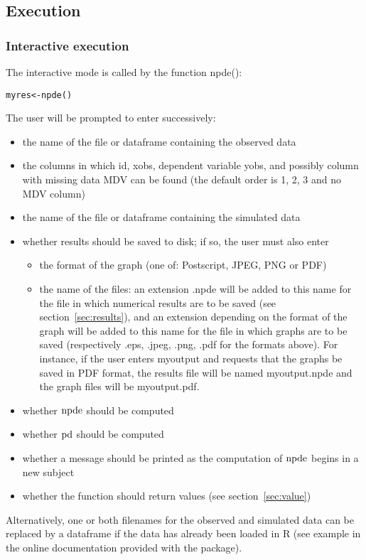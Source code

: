 \subsection{Execution}

\subsubsection{Interactive execution}

\hskip 18pt The interactive mode is called by the function {\sf npde()}:
\begin{verbatim}
myres<-npde()
\end{verbatim}
The user will be prompted to enter successively:
\begin{itemize}
\item the name of the file or dataframe containing the observed data
\item the columns in which id, xobs, dependent variable yobs, and possibly
column with missing data MDV can be found (the default order is 1, 2, 3 and no
MDV column)
\item the name of the file or dataframe containing the simulated data
\item whether results should be saved to disk; if so, the user must also enter
   \begin{itemize}
   \item the format of the graph (one of: Postscript, JPEG, PNG or PDF)
   \item the name of the files: an extension {\sf .npde} will be added to this name for the file in which numerical results are to be saved (see section~\ref{sec:results}), and an extension depending on the format of the graph will be added to this name for the file in which graphs are to be saved (respectively .eps, .jpeg, .png, .pdf for the formats above). For instance, if the user enters {\sf myoutput} and requests that the graphs be saved in PDF format, the results file will be named {\sf myoutput.npde} and the graph files will be {\sf myoutput.pdf}.
   \end{itemize}
\item whether ${\rm npde}$ should be computed
\item whether ${\rm pd}$ should be computed
\item whether a message should be printed as the computation of ${\rm npde}$ begins in a new subject
\item whether the function should return values (see section~\ref{sec:value})
\end{itemize}
Alternatively, one or both filenames for the observed and simulated data can be replaced by a dataframe if the data has already been loaded in {\sf R} (see example in the online documentation provided with the package).

